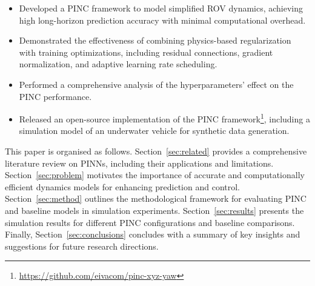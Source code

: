 \begin{itemize}
    \item Developed a PINC framework to model simplified ROV dynamics, achieving high long-horizon prediction accuracy with minimal computational overhead.
    \item Demonstrated the effectiveness of combining physics-based regularization with training optimizations, including residual connections, gradient normalization, and adaptive learning rate scheduling.
    \item Performed a comprehensive analysis of the hyperparameters' effect on the PINC performance.
    \item Released an open-source implementation of the PINC framework\footnote{\url{https://github.com/eivacom/pinc-xyz-yaw}}, including a simulation model of an underwater vehicle for synthetic data generation.
\end{itemize}

    


This paper is organised as follows. Section~\ref{sec:related} provides a comprehensive literature review on PINNs, including their applications and limitations. Section~\ref{sec:problem} motivates the importance of accurate and computationally efficient dynamics models for enhancing prediction and control. Section~\ref{sec:method} outlines the methodological framework for evaluating PINC and baseline models in simulation experiments. Section~\ref{sec:results} presents the simulation results for different PINC configurations and baseline comparisons. Finally, Section~\ref{sec:conclusions} concludes with a summary of key insights and suggestions for future research directions.


